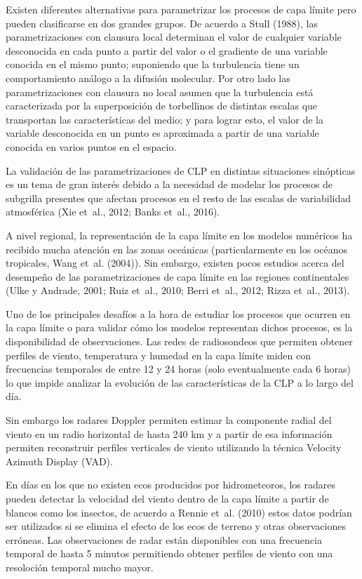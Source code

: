 \documentclass[12pt,spanish,oneside]{book}
\begin{document}
Existen diferentes alternativas para parametrizar los procesos de capa
límite pero pueden clasificarse en dos grandes grupos. De acuerdo a
Stull (1988), las parametrizaciones con clausura local determinan el
valor de cualquier variable desconocida en cada punto a partir del valor
o el gradiente de una variable conocida en el mismo punto; suponiendo
que la turbulencia tiene un comportamiento análogo a la difusión
molecular. Por otro lado las parametrizaciones con clausura no local
asumen que la turbulencia está caracterizada por la superposición de
torbellinos de distintas escalas que transportan las características del
medio; y para lograr esto, el valor de la variable desconocida en un
punto es aproximada a partir de una variable conocida en varios puntos
en el espacio.

La validación de las parametrizaciones de CLP en distintas situaciones
sinópticas es un tema de gran interés debido a la necesidad de modelar
los procesos de subgrilla presentes que afectan procesos en el resto de
las escalas de variabilidad atmosférica (Xie et~al., 2012; Banks et~al.,
2016).

A nivel regional, la representación de la capa límite en los modelos
numéricos ha recibido mucha atención en las zonas oceánicas
(particularmente en los océanos tropicales, Wang et~al. (2004)). Sin
embargo, existen pocos estudios acerca del desempeño de las
parametrizaciones de capa límite en las regiones continentales (Ulke y
Andrade, 2001; Ruiz et~al., 2010; Berri et~al., 2012; Rizza et~al.,
2013).

Uno de los principales desafíos a la hora de estudiar los procesos que
ocurren en la capa límite o para validar cómo los modelos representan
dichos procesos, es la disponibilidad de observaciones. Las redes de
radiosondeos que permiten obtener perfiles de viento, temperatura y
humedad en la capa límite miden con frecuencias temporales de entre 12 y
24 horas (solo eventualmente cada 6 horas) lo que impide analizar la
evolución de las características de la CLP a lo largo del día.

Sin embargo los radares Doppler permiten estimar la componente radial
del viento en un radio horizontal de hasta 240 km y a partir de esa
información permiten reconstruir perfiles verticales de viento
utilizando la técnica Velocity Azimuth Display (VAD).

En días en los que no existen ecos producidos por hidrometeoros, los
radares pueden detectar la velocidad del viento dentro de la capa límite
a partir de blancos como los insectos, de acuerdo a Rennie et~al. (2010)
estos datos podrían ser utilizados si se elimina el efecto de los ecos
de terreno y otras observaciones erróneas. Las observaciones de radar
están disponibles con una frecuencia temporal de hasta 5 minutos
permitiendo obtener perfiles de viento con una resoloción temporal mucho
mayor.
\end{document}
